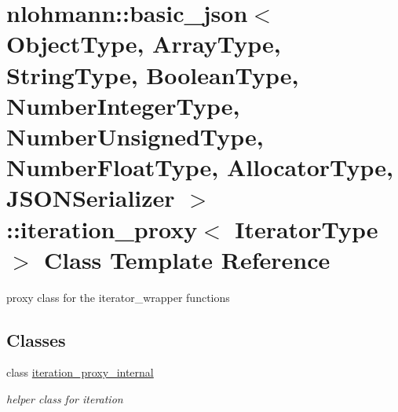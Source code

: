 \hypertarget{classnlohmann_1_1basic__json_1_1iteration__proxy}{}\section{nlohmann\+:\+:basic\+\_\+json$<$ Object\+Type, Array\+Type, String\+Type, Boolean\+Type, Number\+Integer\+Type, Number\+Unsigned\+Type, Number\+Float\+Type, Allocator\+Type, J\+S\+O\+N\+Serializer $>$\+:\+:iteration\+\_\+proxy$<$ Iterator\+Type $>$ Class Template Reference}
\label{classnlohmann_1_1basic__json_1_1iteration__proxy}


proxy class for the iterator\+\_\+wrapper functions  


\subsection*{Classes}
\begin{DoxyCompactItemize}
\item 
class \hyperlink{classnlohmann_1_1basic__json_1_1iteration__proxy_1_1iteration__proxy__internal}{iteration\+\_\+proxy\+\_\+internal}
\begin{DoxyCompactList}\small\item\em helper class for iteration \end{DoxyCompactList}\end{DoxyCompactItemize}
